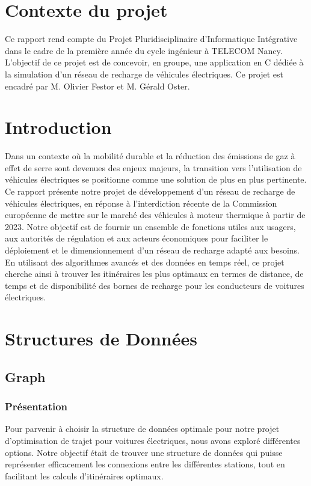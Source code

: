 \documentclass[french,a4paper]{article}
\begin{document}
    \section{Contexte du projet}
    Ce rapport rend compte du Projet Pluridisciplinaire d’Informatique Intégrative dans le cadre de la première année du cycle ingénieur à TELECOM Nancy.
    L’objectif de ce projet est de concevoir, en groupe,  une application en C dédiée à la simulation d’un réseau de recharge de véhicules électriques.
    Ce projet est encadré par M. Olivier Festor et M. Gérald Oster.
    \section{Introduction}
    Dans un contexte où la mobilité durable et la réduction des émissions de gaz à effet
    de serre sont devenues des enjeux majeurs, la transition vers l'utilisation de véhicules électriques se positionne comme une solution
    de plus en plus pertinente.
    Ce rapport présente notre projet de développement d'un réseau de recharge de véhicules électriques, en réponse à l'interdiction récente de la
    Commission européenne de mettre sur le marché des véhicules à moteur thermique à partir de 2023. Notre objectif est de fournir un ensemble de
    fonctions utiles aux usagers, aux autorités de régulation et aux acteurs économiques pour faciliter le déploiement et le dimensionnement d'un
    réseau de recharge adapté aux besoins.
    En utilisant des algorithmes avancés et des données en temps réel, ce projet cherche ainsi à trouver les itinéraires les plus optimaux en termes de distance, de temps et de disponibilité des
    bornes de recharge pour les conducteurs de voitures électriques.

    \section{Structures de Données}
    \subsection{Graph}
    \subsubsection{Présentation}
    Pour parvenir à choisir la structure de données optimale pour notre projet d'optimisation de trajet pour voitures électriques, nous avons exploré
    différentes options. Notre objectif était de trouver une structure de données qui puisse représenter
    efficacement les connexions entre les différentes stations, tout en facilitant les calculs d'itinéraires optimaux.
\end{document}
